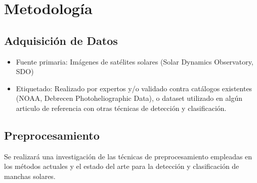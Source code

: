 \documentclass[conference]{IEEEtran}
\begin{document}
\section*{Metodología}

\subsection*{Adquisición de Datos}
\begin{itemize}
    \item Fuente primaria: Imágenes de satélites solares (Solar Dynamics Observatory, SDO)
    \item Etiquetado: Realizado por expertos y/o validado contra catálogos existentes (NOAA, Debrecen Photoheliographic Data), o dataset utilizado en algún articulo de referencia con otras técnicas de detección y clasificación.
\end{itemize}


\subsection*{Preprocesamiento}
Se realizará una investigación de las técnicas de preprocesamiento empleadas en los métodos actuales y el estado del arte para la detección y clasificación de manchas solares. %
\end{document}
